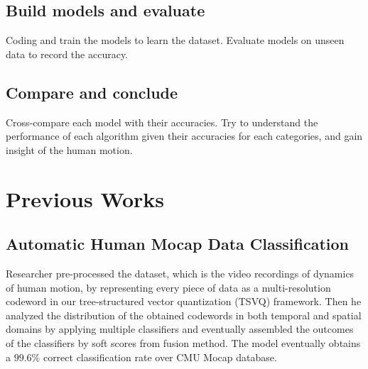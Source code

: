 \documentclass[letterpaper, 10pt, conference]{ieeeconf}
\begin{document}
\subsection{Build models and evaluate}

Coding and train the models to learn the dataset. Evaluate models on unseen data to record the accuracy. 

\subsection{Compare and conclude}

Cross-compare each model with their accuracies. Try to understand the performance of each algorithm given their accuracies for each categories, and gain insight of the human motion. \\

\section{Previous Works}

\subsection{Automatic Human Mocap Data Classification}
Researcher pre-processed the dataset, which is the video recordings of dynamics of human motion, by representing every piece of data as a multi-resolution codeword in our tree-structured vector quantization (TSVQ) framework. Then he analyzed the distribution of the obtained codewords in both temporal and spatial domains by applying multiple classifiers and eventually assembled the outcomes of the classifiers by soft scores from fusion method. The model eventually obtains a $99.6\%$ correct classification rate over CMU Mocap database. 
\end{document}
